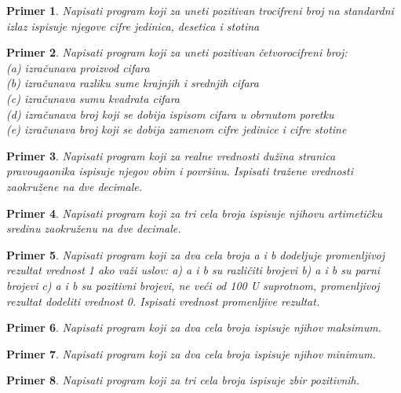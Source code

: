 \documentclass[a4paper]{article}
\newtheorem{primer}{Primer}[section]
\begin{document}
\begin{primer}
Napisati program koji za uneti pozitivan trocifreni broj na
standardni izlaz ispisuje njegove cifre jedinica, desetica i stotina
\end{primer}

\begin{primer}
Napisati program koji za uneti pozitivan četvorocifreni
broj:\\
(a) izračunava proizvod cifara\\
(b) izračunava razliku sume krajnjih i srednjih cifara\\
(c) izračunava sumu kvadrata cifara\\
(d) izračunava broj koji se dobija ispisom cifara u obrnutom poretku\\
(e) izračunava broj koji se dobija zamenom cifre jedinice i cifre stotine\\
\end{primer}

\begin{primer}
Napisati program koji za realne vrednosti dužina
stranica pravougaonika ispisuje njegov obim i površinu. Ispisati tražene vrednosti
zaokružene na dve decimale. 
\end{primer}

\begin{primer}
Napisati program koji za tri cela broja ispisuje
njihovu artimetičku sredinu zaokruženu na dve decimale.
\end{primer}

\begin{primer}
Napisati program koji za dva cela broja a i b dodeljuje
promenljivoj rezultat vrednost 1 ako važi uslov:
a) a i b su različiti brojevi
b) a i b su parni brojevi
c) a i b su pozitivni brojevi, ne veći od 100
U suprotnom, promenljivoj rezultat dodeliti vrednost 0. Ispisati vrednost promenljive
rezultat.
\end{primer}


\begin{primer}
Napisati program koji za dva cela broja ispisuje
njihov maksimum.
\end{primer}

\begin{primer}
Napisati program koji za dva cela broja ispisuje
njihov minimum.
\end{primer}

\begin{primer}
Napisati program koji za tri cela broja ispisuje zbir
pozitivnih.
\end{primer}
\end{document}
